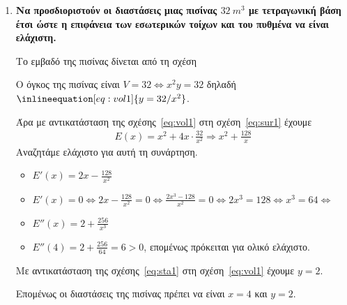 



\pagestyle{askhseis}
\everymath{\displaystyle}



\begin{center}
  \minibox{\large \bfseries \textcolor{Col1}{Προβλήματα Ακροτάτων}}
\end{center}

\vspace{\baselineskip}

\begin{enumerate}

  \item {\bfseries \boldmath Να προσδιοριστούν οι διαστάσεις μιας πισίνας 
      $ \SI{32}{m^{3}} $ με τετραγωνική βάση έτσι ώστε η επιφάνεια των εσωτερικών 
    τοίχων και του πυθμένα να είναι ελάχιστη.}
    \begin{solution}
      Το εμβαδό της πισίνας δίνεται από τη σχέση

      Ο όγκος της πισίνας είναι $V = 32 \Leftrightarrow  x^{2}y = 32$
      δηλαδή $\inlineequation[eq:vol1]{y = {32}/{x^{2}}}$.

      Άρα με αντικατάσταση της σχέσης~\eqref{eq:vol1} στη
      σχέση~\eqref{eq:sur1} έχουμε
      \begin{align*}
        E(x) = x^{2} + 4x\cdot \frac{32}{x^{2}} \Rightarrow x^{2} +	\frac{128}{x}
      \end{align*}
      Αναζητάμε ελάχιστο για αυτή τη συνάρτηση.
      \begin{itemize}
        \item $ E'(x) = 2x - \frac{128}{x^{2}} $ 
        \item $ E'(x) = 0 \Leftrightarrow 2x - \frac{128}{x^{2}} = 0
          \Leftrightarrow \frac{2x^{3} - 128}{x^{2}} = 0 \Leftrightarrow
          2x^{3} = 128 \Leftrightarrow x^{3} = 64 \Leftrightarrow$
        \item $ E''(x) = 2 + \frac{256}{x^{3}} $
        \item $ E''(4) = 2 + \frac{256}{64} = 6 > 0 $, επομένως πρόκειται για
          ολικό ελάχιστο.
      \end{itemize}
      Με αντικατάσταση της σχέσης~\eqref{eq:sta1} στη σχέση~\eqref{eq:vol1} έχουμε 
      $ y = 2 $.

      Επομένως οι διαστάσεις της πισίνας πρέπει να είναι $ x = 4 $ και $ y = 2 $.
    \end{solution}


\end{enumerate}
